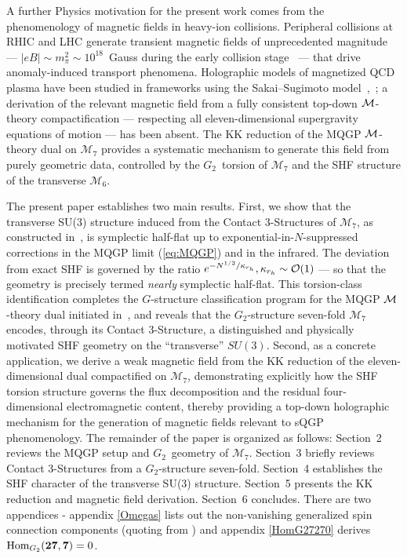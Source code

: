 \documentclass[a4paper,11pt,fleqn]{article}
\theoremstyle{plain}
\theoremstyle{definition}
\begin{document}
A further Physics motivation for the present work comes from the phenomenology of magnetic fields in heavy-ion collisions. Peripheral collisions at RHIC and LHC generate transient magnetic fields
of unprecedented magnitude --- $|eB|\sim m_\pi^2\sim 10^{18}$~Gauss during the early collision
stage~\cite{Kharzeev:2007jp} --- that drive anomaly-induced transport phenomena. %
Holographic models of magnetized QCD plasma have been studied in frameworks using the Sakai--Sugimoto model~\cite{SS},~\cite{Rebhan:2010bd};
a derivation of the relevant magnetic field from a fully consistent top-down ${\cal M}$-theory
compactification --- respecting all eleven-dimensional supergravity equations of motion  --- has been absent. The KK reduction of the MQGP ${\cal M}$-theory dual on
$\mathcal{M}_7$ provides a systematic mechanism to generate this field from purely geometric
data, controlled by the $G_2$~torsion of $\mathcal{M}_7$ and the SHF structure of the
transverse $\mathcal{M}_6$.

The present paper establishes two main results. First, we show that the transverse SU(3)
structure  induced from the Contact 3-Structures of $\mathcal{M}_7$, as
constructed in~\cite{ACMS}, is symplectic half-flat up to exponential-in-$N$-suppressed corrections in the MQGP limit (\ref{eq:MQGP}) and in the infrared. The deviation from exact SHF is
governed by the ratio $e^{-N^{1/3}/\kappa_{r_h}}, \kappa_{r_h}\sim{\cal O}(1)$  --- so that the geometry is precisely termed \emph{nearly} symplectic
half-flat. This torsion-class identification completes the $G$-structure classification program
for the MQGP ${\cal M}$-theory dual initiated in~\cite{NPB,ACMS}, and reveals that the
$G_2$-structure seven-fold $\mathcal{M}_7$ encodes, through its Contact 3-Structure, a
distinguished and physically motivated SHF geometry on the ``transverse'' $SU(3)$. Second, as a
concrete application, we derive a weak magnetic field from the KK reduction of the
eleven-dimensional dual compactified on $\mathcal{M}_7$, demonstrating explicitly how the SHF
torsion structure governs the flux decomposition and the residual four-dimensional
electromagnetic content, thereby providing a top-down holographic mechanism for the generation
of magnetic fields relevant to sQGP phenomenology. The remainder of the paper is organized as
follows: Section~2 reviews the MQGP setup and $G_2$~geometry of $\mathcal{M}_7$. Section~3 briefly reviews Contact 3-Structures from a $G_2$-structure seven-fold. Section~4
establishes the SHF character of the transverse SU(3) structure. Section~5 presents the KK
reduction and magnetic field derivation. Section~6 concludes. There are two appendices - appendix \ref{Omegas} lists out the non-vanishing generalized spin connection components (quoting from \cite{ACMS}) and appendix \ref{HomG27270} derives ${\rm Hom}_{G_2}({\bf 27}, {\bf 7})=0$.
\end{document}
